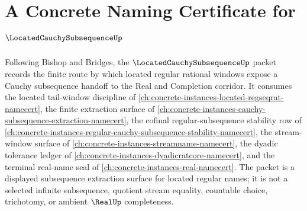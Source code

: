 \chapter{A Concrete Naming Certificate for $\LocatedCauchySubsequenceUp$}
\label{ch:concrete-instances-located-cauchy-subsequence-namecert}

Following Bishop and Bridges, the $\LocatedCauchySubsequenceUp$ packet records the finite route by which located regular rational windows expose a Cauchy subsequence handoff to the Real and Completion corridor. It consumes the located tail-window discipline of \autoref{ch:concrete-instances-located-regseqrat-namecert}, the finite extraction surface of \autoref{ch:concrete-instances-cauchy-subsequence-extraction-namecert}, the cofinal regular-subsequence stability row of \autoref{ch:concrete-instances-regular-cauchy-subsequence-stability-namecert}, the stream-window surface of \autoref{ch:concrete-instances-streamname-namecert}, the dyadic tolerance ledger of \autoref{ch:concrete-instances-dyadicratcore-namecert}, and the terminal real-name seal of \autoref{ch:concrete-instances-real-namecert}. The packet is a displayed subsequence extraction surface for located regular names; it is not a selected infinite subsequence, quotient stream equality, countable choice, trichotomy, or ambient $\RealUp$ completeness.

